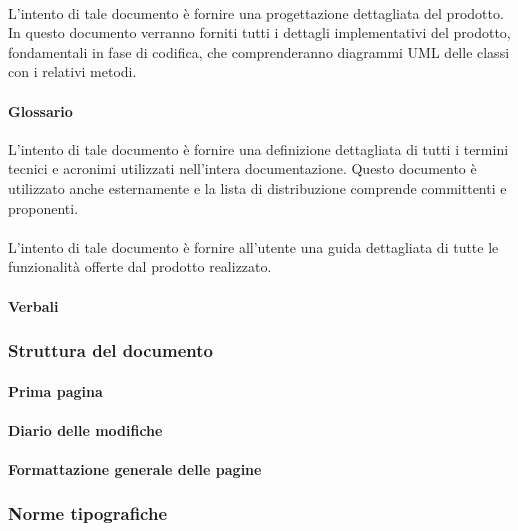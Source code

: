 \paragraph{\DDP}
L'intento di tale documento è fornire una progettazione dettagliata del 
prodotto. In questo documento verranno forniti tutti i dettagli implementativi 
del prodotto, fondamentali in fase di codifica, che comprenderanno diagrammi UML 
delle classi con i relativi metodi.
\paragraph{Glossario}
L'intento di tale documento è fornire una definizione dettagliata di tutti i 
termini tecnici e acronimi utilizzati nell'intera documentazione. Questo documento è 
utilizzato anche esternamente e la lista di distribuzione comprende committenti 
e proponenti.
\paragraph{\MU}
L'intento di tale documento è fornire all'utente una guida dettagliata di tutte 
le funzionalità offerte dal prodotto realizzato.
\paragraph{Verbali}

\subsubsection{Struttura del documento}

\paragraph{Prima pagina}

\paragraph{Diario delle modifiche}

\paragraph{Formattazione generale delle pagine}

\subsubsection{Norme tipografiche}

